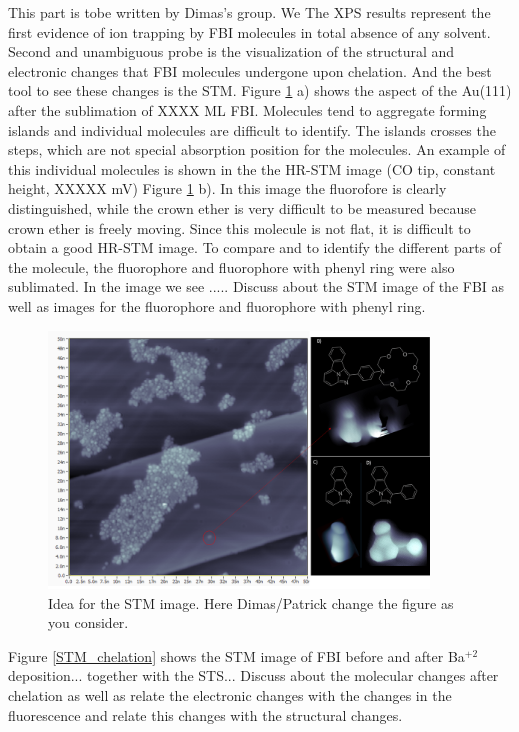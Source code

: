 \documentclass[aps,prl,reprint,longbibliography,superscriptaddress]{revtex4-1}
\def\Ba{Ba$^{+2}$ }
\newcommand{\completar}[1]{{\color{red} #1}}
\begin{document}
\completar{This part is tobe written by Dimas's group. We } The XPS results represent the first evidence of ion trapping by FBI molecules in total absence of any solvent. Second and unambiguous probe is the visualization of the structural and electronic changes that FBI molecules undergone upon chelation. And the best tool to see these changes is the STM. Figure \ref{STM_FBI_fluorophore} a) shows the aspect of the Au(111) after the sublimation of XXXX ML FBI. Molecules tend to aggregate forming islands and individual molecules are difficult to identify. The islands crosses the steps, which are not special absorption position for the molecules. An example of this individual molecules is shown in the the HR-STM image (CO tip, constant height, XXXXX mV) Figure \ref{STM_FBI_fluorophore} b). In this image the fluorofore is clearly distinguished, while the crown ether is very difficult to be measured because crown ether is freely moving. 
Since this molecule is not flat, it is difficult to obtain a good HR-STM image. To compare and to identify the different parts of the molecule, the fluorophore and fluorophore with phenyl ring were also sublimated. In the image we see ..... \completar{Discuss about the STM image of the FBI as well as images for the fluorophore and fluorophore with phenyl ring.}

\begin{figure}[ht!]
	\includegraphics[width=0.9\textwidth]{figures/STM_FBI_fluoroforos.png}
	\caption{\label{STM_FBI_fluorophore} 
    Idea for the STM image. Here Dimas/Patrick change the figure as you consider. }
\end{figure}  

Figure \ref{STM_chelation} shows the STM image of FBI before and after \Ba deposition... together with the STS... \completar{Discuss about the molecular changes after chelation as well as relate the electronic changes with the changes in the fluorescence and relate this changes with the structural changes.}
\end{document}

